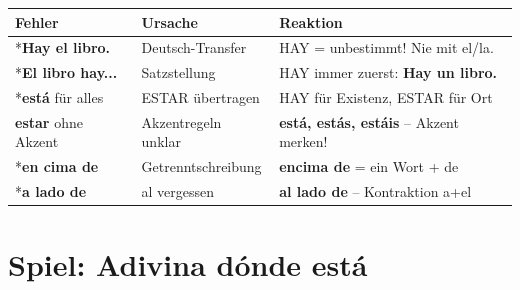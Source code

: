 \documentclass[11pt,a4paper]{article}
\newcommand{\es}[1]{\textbf{#1}}
\begin{document}
\begin{tabular}{|p{3.8cm}|p{4cm}|p{5.5cm}|}
\hline
\textbf{Fehler} & \textbf{Ursache} & \textbf{Reaktion} \\
\hline
*\es{Hay el libro.} & Deutsch-Transfer & HAY = unbestimmt! Nie mit el/la. \\
\hline
*\es{El libro hay...} & Satzstellung & HAY immer zuerst: \es{Hay un libro.} \\
\hline
*\es{está} für alles & ESTAR übertragen & HAY für Existenz, ESTAR für Ort \\
\hline
\es{estar} ohne Akzent & Akzentregeln unklar & \es{está, estás, estáis} -- Akzent merken! \\
\hline
*\es{en cima de} & Getrenntschreibung & \es{encima de} = ein Wort + de \\
\hline
*\es{a lado de} & al vergessen & \es{al lado de} -- Kontrak\-tion a+el \\
\hline
\end{tabular}

\vspace{0.5cm}

\section*{Spiel: Adivina dónde está}
\end{document}
